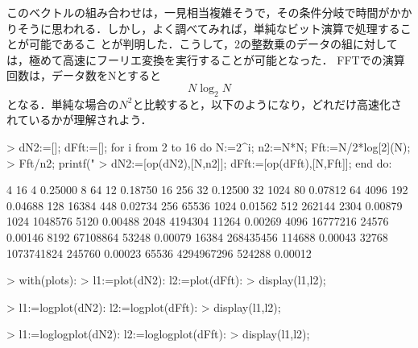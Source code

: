 このベクトルの組み合わせは，一見相当複雑そうで，その条件分岐で時間がかかりそうに思われる．しかし，よく調べてみれば，単純なビット演算で処理することが可能であるこ
とが判明した．こうして，2の整数乗のデータの組に対しては，極めて高速にフーリエ変換を実行することが可能となった．
FFTでの演算回数は，データ数をNとすると
\begin{equation*}
N\log_2 N
\end{equation*}
となる．単純な場合の$N^2$と比較すると，以下のようになり，どれだけ高速化されているかが理解されよう．
\begin{MapleInput}
> dN2:=[]; dFft:=[]; for i from 2 to 16 do N:=2^i; n2:=N*N; Fft:=N/2*log[2](N);
> Fft/n2; printf("%
> dN2:=[op(dN2),[N,n2]]; dFft:=[op(dFft),[N,Fft]]; end do:
\end{MapleInput}
\begin{MapleError}
         4           16            4    0.25000
         8           64           12    0.18750
        16          256           32    0.12500
        32         1024           80    0.07812
        64         4096          192    0.04688
       128        16384          448    0.02734
       256        65536         1024    0.01562
       512       262144         2304    0.00879
      1024      1048576         5120    0.00488
      2048      4194304        11264    0.00269
      4096     16777216        24576    0.00146
      8192     67108864        53248    0.00079
     16384    268435456       114688    0.00043
     32768   1073741824       245760    0.00023
     65536   4294967296       524288    0.00012
\end{MapleError}
\begin{MapleInput}
> with(plots):
> l1:=plot(dN2): l2:=plot(dFft):
> display(l1,l2);
\end{MapleInput}

\begin{MapleInput}
> l1:=logplot(dN2): l2:=logplot(dFft):
> display(l1,l2);
\end{MapleInput}

\begin{MapleInput}
> l1:=loglogplot(dN2): l2:=loglogplot(dFft):
> display(l1,l2);
\end{MapleInput}
